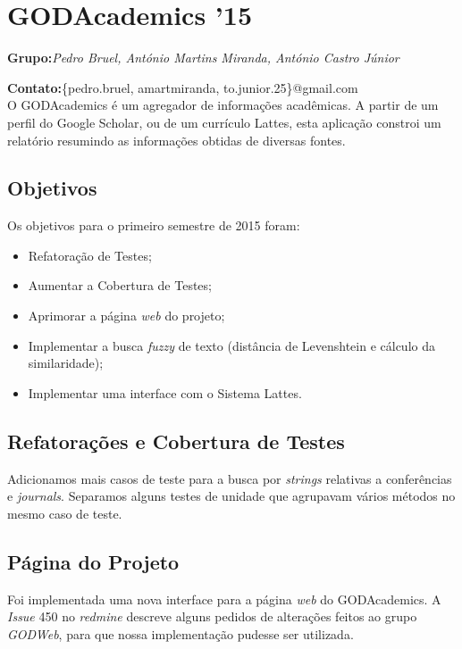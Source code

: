 \documentclass[12pt]{article}
\begin{document}
\section{GODAcademics '15}

\textbf{Grupo:}\textit{Pedro Bruel, António Martins Miranda, António Castro Júnior}

\textbf{Contato:}\{pedro.bruel, amartmiranda, to.junior.25\}@gmail.com\\

O GODAcademics é um agregador de informações acadêmicas. A partir de um perfil
do Google Scholar, ou de um currículo Lattes, esta aplicação constroi 
um relatório resumindo as informações obtidas de diversas fontes.

\subsection{Objetivos}

Os objetivos para o primeiro semestre de 2015 foram:

\begin{itemize}
    \item Refatoração de Testes;
    \item Aumentar a Cobertura de Testes;
    \item Aprimorar a página \emph{web} do projeto;
    \item Implementar a busca \emph{fuzzy} de texto (distância de Levenshtein e cálculo da similaridade);
    \item Implementar uma interface com o Sistema Lattes.
\end{itemize}

\subsection{Refatorações e Cobertura de Testes}

Adicionamos mais casos de teste para a busca por \emph{strings}
relativas a conferências e \emph{journals}. Separamos alguns testes
de unidade que agrupavam vários métodos no mesmo caso de teste.

\subsection{Página do Projeto}

Foi implementada uma nova interface para a página \emph{web}
do GODAcademics. A \emph{Issue} 450 no \emph{redmine} descreve
alguns pedidos de alterações feitos ao grupo \emph{GODWeb},
para que nossa implementação pudesse ser utilizada.
\end{document}
